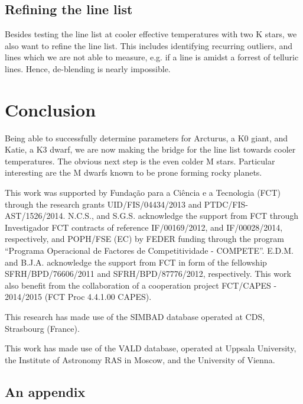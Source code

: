 \documentclass{aa}
\begin{document}
\subsection{Refining the line list}
\label{sub:refining_the_line_list}
Besides testing the line list at cooler effective temperatures
with two K stars, we also want to refine the line list. This
includes identifying recurring outliers, and lines which we are
not able to measure, e.g. if a line is amidst a forrest of
telluric lines. Hence, de-blending is nearly impossible.









\section{Conclusion}
\label{sec:conclusion}
Being able to successfully determine parameters for Arcturus, a K0 giant,
and Katie, a K3 dwarf,
we are now making the bridge for the line list towards cooler temperatures.
The obvious next step is the even colder M stars. Particular interesting
are the M dwarfs known to be prone forming rocky planets.





\begin{acknowledgements}

This work was supported by Funda\c{c}\~ao para a Ci\^encia e a
Tecnologia (FCT) through the research grants UID/FIS/04434/2013 and
PTDC/FIS-AST/1526/2014. N.C.S., and S.G.S. acknowledge the support from
FCT through Investigador FCT contracts of reference IF/00169/2012, and
IF/00028/2014, respectively, and POPH/FSE (EC) by FEDER funding through
the program “Programa Operacional de Factores de Competitividade
- COMPETE”. E.D.M. and B.J.A. acknowledge the support from FCT in
form of the fellowship SFRH/BPD/76606/2011 and SFRH/BPD/87776/2012,
respectively. This work also benefit from the collaboration of a
cooperation project FCT/CAPES - 2014/2015 (FCT Proc 4.4.1.00 CAPES).

This research has made use of the SIMBAD database operated at CDS,
Strasbourg (France).

This work has made use of the VALD database, operated at Uppsala
University, the Institute of Astronomy RAS in Moscow, and the University
of Vienna.

\end{acknowledgements}






\begin{appendix}
\section{An appendix}


\end{appendix}
\end{document}
